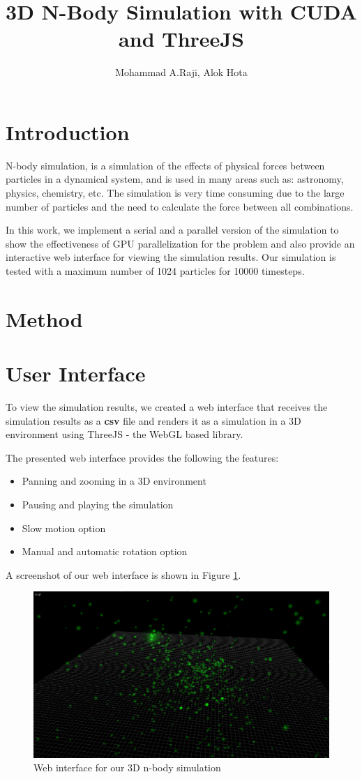 \documentclass[10pt,a4paper]{article}
\author{Mohammad A.Raji, Alok Hota}
\title{3D N-Body Simulation with CUDA and ThreeJS}
\begin{document}
	\maketitle
	
	\section{Introduction}
	N-body simulation, is a simulation of the effects of physical forces between particles in a dynamical system, and is used in many areas such as: astronomy, physics, chemistry, etc. The simulation is very time consuming due to the large number of particles and the need to calculate the force between all combinations. 
	
	In this work, we implement a serial and a parallel version of the simulation to show the effectiveness of GPU parallelization for the problem and also provide an interactive web interface for viewing the simulation results. Our simulation is tested with a maximum number of 1024 particles for 10000 timesteps. 
	\section{Method}
	
	\section{User Interface}
	To view the simulation results, we created a web interface that receives the simulation results as a \textbf{csv} file and renders it as a simulation in a 3D environment using ThreeJS - the WebGL based library.
	
	The presented web interface provides the following the features: 
	\begin{itemize}
		\item Panning and zooming in a 3D environment
		\item Pausing and playing the simulation 
		\item Slow motion option
		\item Manual and automatic rotation option
	\end{itemize}
	
	A screenshot of our web interface is shown in Figure \ref{scr}.
	\begin{figure}
		\centering
		\includegraphics[scale=0.3]{scr.png}
		\caption{Web interface for our 3D n-body simulation}
		\label{scr}
	\end{figure}
	
\end{document}
